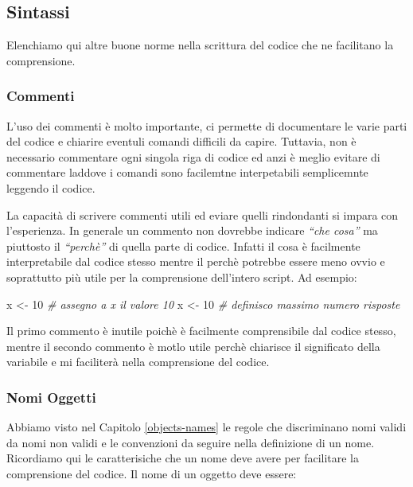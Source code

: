 \documentclass[
]{book}
\newenvironment{Shaded}{\begin{snugshade}}{\end{snugshade}}
\newcommand{\CommentTok}[1]{\textcolor[rgb]{0.56,0.35,0.01}{\textit{#1}}}
\newcommand{\DecValTok}[1]{\textcolor[rgb]{0.00,0.00,0.81}{#1}}
\newcommand{\NormalTok}[1]{#1}
\newcommand{\StringTok}[1]{\textcolor[rgb]{0.31,0.60,0.02}{#1}}
\begin{document}
\hypertarget{sintassi}{%
\subsection{Sintassi}\label{sintassi}}

Elenchiamo qui altre buone norme nella scrittura del codice che ne facilitano la comprensione.

\hypertarget{commenti}{%
\subsubsection*{Commenti}\label{commenti}}

L'uso dei commenti è molto importante, ci permette di documentare le varie parti del codice e chiarire eventuli comandi difficili da capire. Tuttavia, non è necessario commentare ogni singola riga di codice ed anzi è meglio evitare di commentare laddove i comandi sono facilemtne interpetabili semplicemnte leggendo il codice.

La capacità di scrivere commenti utili ed eviare quelli rindondanti si impara con l'esperienza. In generale un commento non dovrebbe indicare \emph{``che cosa''} ma piuttosto il \emph{``perchè''} di quella parte di codice. Infatti il cosa è facilmente interpretabile dal codice stesso mentre il perchè potrebbe essere meno ovvio e soprattutto più utile per la comprensione dell'intero script. Ad esempio:

\begin{Shaded}
\begin{Highlighting}[]
\NormalTok{x <-}\StringTok{ }\DecValTok{10} \CommentTok{# assegno a x il valore 10}
\NormalTok{x <-}\StringTok{ }\DecValTok{10} \CommentTok{# definisco massimo numero risposte}
\end{Highlighting}
\end{Shaded}

Il primo commento è inutile poichè è facilmente comprensibile dal codice stesso, mentre il secondo commento è motlo utile perchè chiarisce il significato della variabile e mi faciliterà nella comprensione del codice.

\hypertarget{nomi-oggetti}{%
\subsubsection*{Nomi Oggetti}\label{nomi-oggetti}}

Abbiamo visto nel Capitolo \ref{objects-names} le regole che discriminano nomi validi da nomi non validi e le convenzioni da seguire nella definizione di un nome. Ricordiamo qui le caratterisiche che un nome deve avere per facilitare la comprensione del codice. Il nome di un oggetto deve essere:
\end{document}
